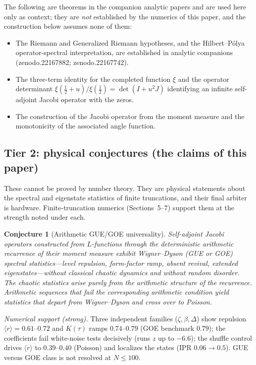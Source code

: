 \documentclass[aps,prx,reprint,floatfix]{revtex4-2}
\newtheorem{conjecture}{Conjecture}
\begin{document}
The following are theorems in the companion analytic papers and are used here
only as context; they are \emph{not} established by the numerics of this
paper, and the construction below assumes none of them:
\begin{itemize}[leftmargin=1.4em]
\item The Riemann and Generalized Riemann hypotheses, and the Hilbert--P\'olya
operator-spectral interpretation, are established in analytic companions
(zenodo.22167882; zenodo.22167742).
\item The three-term identity for the completed function $\xi$ and the
operator determinant $\xi(\tfrac12+u)/\xi(\tfrac12)=\det(I+u^{2}J)$
identifying an infinite self-adjoint Jacobi operator with the zeros.
\item The construction of the Jacobi operator from the moment measure and the
monotonicity of the associated angle function.
\end{itemize}

\subsection{Tier 2: physical conjectures (the claims of this paper)}

These cannot be proved by number theory. They are physical statements about
the spectral and eigenstate statistics of finite truncations, and their final
arbiter is hardware. Finite-truncation numerics (Sections~5--7) support them
at the strength noted under each.

\begin{conjecture}[Arithmetic GUE/GOE universality]
\label{conj:gue}
Self-adjoint Jacobi operators constructed from $L$-functions through the
deterministic arithmetic recurrence of their moment measure exhibit
Wigner--Dyson (GUE or GOE) spectral statistics---level repulsion, form-factor
ramp, absent revival, extended eigenstates---without classical chaotic
dynamics and without random disorder. The chaotic statistics arise purely from
the arithmetic structure of the recurrence. Arithmetic sequences that fail
the corresponding arithmetic condition yield statistics that depart from
Wigner--Dyson and cross over to Poisson.
\end{conjecture}
\noindent\emph{Numerical support (strong).} Three independent families
($\zeta,\beta,\Delta$) show repulsion $\langle r\rangle=0.61$--$0.72$
and $K(\tau)$ ramps $0.74$--$0.79$ (GOE benchmark $0.79$); the coefficients
fail white-noise tests decisively (runs $z$ up to $-6.6$); the shuffle control
drives $\langle r\rangle$ to $0.39$--$0.40$ (Poisson) and localizes the states
(IPR $0.06\to0.5$). GUE versus GOE class is not resolved at $N\le100$.
\end{document}

